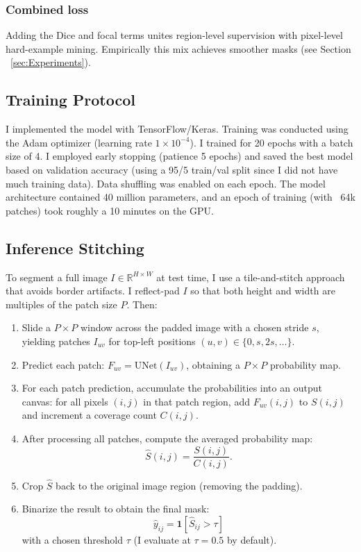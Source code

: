 \documentclass[11pt]{article}
\begin{document}
\subsubsection{Combined loss}
\label{sec:CLoss}
Adding the Dice and focal terms unites region-level supervision with pixel-level hard-example mining. Empirically this mix achieves smoother masks (see Section ~\ref{sec:Experiments}).


\subsection{Training Protocol}
\label{sec:Training}
I implemented the model with TensorFlow/Keras. Training was conducted using the Adam optimizer (learning rate $1\times10^{-4}$). I trained for 20 epochs with a batch size of 4. I employed early stopping (patience 5 epochs) and saved the best model based on validation accuracy (using a 95/5 train/val split since I did not have much training data). Data shuffling was enabled on each epoch. The model architecture contained 40 million parameters, and an epoch of training (with ~64k patches) took roughly a 10 minutes on the GPU.

\subsection{Inference Stitching}
\label{sec:Inference}
To segment a full image $I \in \mathbb{R}^{H \times W}$ at test time, I use a tile-and-stitch approach that avoids border artifacts. I reflect-pad $I$ so that both height and width are multiples of the patch size $P$. Then:

\begin{enumerate}
    \item Slide a $P \times P$ window across the padded image with a chosen stride $s$, yielding patches $I_{uv}$ for top-left positions $(u,v) \in \{0, s, 2s, \dots\}$.
    
    \item Predict each patch: $F_{uv} = \text{UNet}(I_{uv})$, obtaining a $P \times P$ probability map.
    
    \item For each patch prediction, accumulate the probabilities into an output canvas: for all pixels $(i,j)$ in that patch region, add $F_{uv}(i,j)$ to $S(i,j)$ and increment a coverage count $C(i,j)$.
    
    \item After processing all patches, compute the averaged probability map:
    \[
    \hat{S}(i,j) = \frac{S(i,j)}{C(i,j)}.
    \]
    
    \item Crop $\hat{S}$ back to the original image region (removing the padding).
    
    \item Binarize the result to obtain the final mask:
    \[
    \hat{y}_{ij} = \mathbf{1}[\hat{S}_{ij} > \tau]
    \]
    with a chosen threshold $\tau$ (I evaluate at $\tau = 0.5$ by default).
\end{enumerate}
\end{document}
